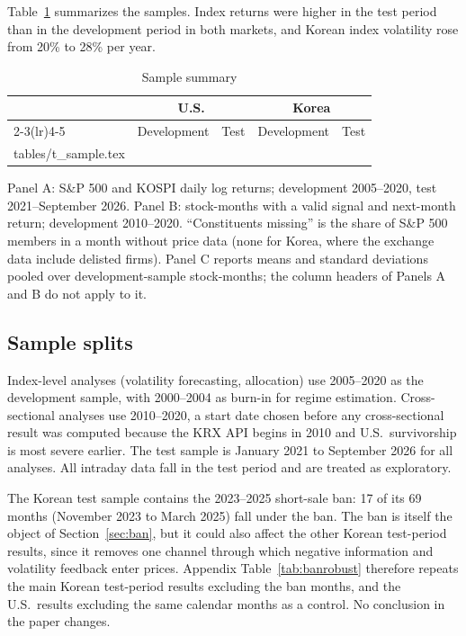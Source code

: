 \documentclass[11pt]{article}
\makeatletter
\newcommand\inputtable[1]{\@@input #1 }
\makeatother
\begin{document}
Table~\ref{tab:sample} summarizes the samples. Index returns were higher in the test period than in the development period in both markets, and Korean index volatility rose from 20\% to 28\% per year.

\begin{table}[!htbp]
\centering
\begin{threeparttable}
\caption{Sample summary}\label{tab:sample}
\small
\begin{tabular}{lcccc}
\toprule
 & \multicolumn{2}{c}{U.S.} & \multicolumn{2}{c}{Korea} \\
\cmidrule(lr){2-3}\cmidrule(lr){4-5}
 & Development & Test & Development & Test \\
\midrule
\inputtable{tables/t_sample.tex}
\bottomrule
\end{tabular}
\begin{tablenotes}\footnotesize
\item Panel A: S\&P 500 and KOSPI daily log returns; development 2005--2020, test 2021--September 2026. Panel B: stock-months with a valid signal and next-month return; development 2010--2020. ``Constituents missing'' is the share of S\&P 500 members in a month without price data (none for Korea, where the exchange data include delisted firms). Panel C reports means and standard deviations pooled over development-sample stock-months; the column headers of Panels A and B do not apply to it.
\end{tablenotes}
\end{threeparttable}
\end{table}

\subsection{Sample splits}

Index-level analyses (volatility forecasting, allocation) use 2005--2020 as the development sample, with 2000--2004 as burn-in for regime estimation. Cross-sectional analyses use 2010--2020, a start date chosen before any cross-sectional result was computed because the KRX API begins in 2010 and U.S.\ survivorship is most severe earlier. The test sample is January 2021 to September 2026 for all analyses. All intraday data fall in the test period and are treated as exploratory.

The Korean test sample contains the 2023--2025 short-sale ban: 17 of its 69 months (November 2023 to March 2025) fall under the ban. The ban is itself the object of Section~\ref{sec:ban}, but it could also affect the other Korean test-period results, since it removes one channel through which negative information and volatility feedback enter prices. Appendix Table~\ref{tab:banrobust} therefore repeats the main Korean test-period results excluding the ban months, and the U.S.\ results excluding the same calendar months as a control. No conclusion in the paper changes.
\end{document}
